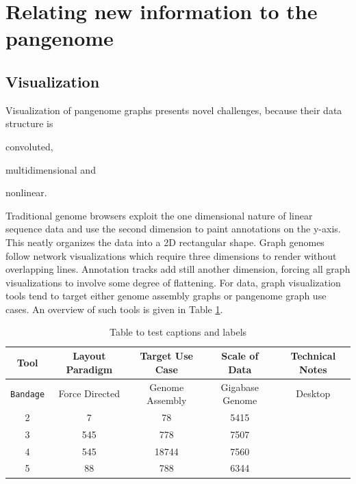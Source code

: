\section{Relating new information to the pangenome}

\subsection{Visualization}

\cite{nielsen2009abyss}
\cite{nazarie_visualization_nodate_2019}

Visualization of pangenome graphs presents novel challenges, because their data structure is \begin{enumerate*}[label=(\alph*)]
\item convoluted,
\item multidimensional and
\item nonlinear.
\end{enumerate*} Traditional genome browsers exploit the one dimensional nature of linear sequence data and use the second dimension to paint annotations on the y-axis. This neatly organizes the data into a 2D rectangular shape. Graph genomes follow network visualizations which require three dimensions to render without overlapping lines.
Annotation tracks add still another dimension, forcing all graph visualizations to involve some degree of flattening.  
For data, graph visualization tools tend to target either genome assembly graphs or pangenome graph use cases.
An overview of such tools is given in Table \ref{table:1}.

\begin{table}[h!]
\centering
\caption{Table to test captions and labels}
\begin{tabular}{|c|c|c|c|c|} 
 \hline
 Tool & Layout Paradigm & Target Use Case & Scale of Data & Technical Notes \\ [0.5ex] 
 \hline
 \texttt{Bandage} & Force Directed & Genome Assembly & Gigabase Genome & Desktop \\ 
 2 & 7 & 78 & 5415 \\
 3 & 545 & 778 & 7507 \\
 4 & 545 & 18744 & 7560 \\
 5 & 88 & 788 & 6344 \\ [1ex] 
 \hline
\end{tabular}
\label{table:1}
\end{table}

